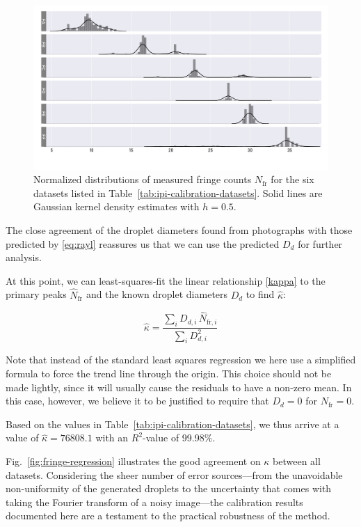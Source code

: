 \documentclass[11.5pt,oneside]{book}
\newcommand*{\figref}[1]{Fig.~\ref{#1}}
\newcommand*{\tableref}[1]{Table~\ref{#1}}
\begin{document}
\begin{figure}
    \centering
    \includegraphics[width=\textwidth]{img/fringe_histogram.pdf}
    \caption{Normalized distributions of measured fringe counts $N_\text{fr}$
        for the six datasets listed in \tableref{tab:ipi-calibration-datasets}. Solid lines are
Gaussian kernel density estimates with $h=0.5$. }
    \label{fig:fringe-histograms}
\end{figure}

The close agreement of the droplet diameters found from photographs with those
predicted by \eqref{eq:rayl} reassures us that we can use the predicted $D_d$
for further analysis.

At this point, we can least-squares-fit the linear relationship \eqref{kappa} to the primary
peaks $\hat{N}_\text{fr}$ and the known droplet diameters $D_d$ to find
$\hat{\kappa}$:

\begin{equation}
    \hat{\kappa} = \frac{\sum_i D_{d,i} \, \hat{N}_{\text{fr}, i}}{\sum_i
    D_{d,i}^2}
\end{equation}

Note that instead of the standard least squares regression we here use a
simplified formula to force the trend line through the origin. This choice
should not be made lightly, since it will usually cause the residuals to have a
non-zero mean. In this case, however, we believe it to be justified to require
that $D_d = 0$ for $N_\text{fr} = 0$.

Based on the values in \tableref{tab:ipi-calibration-datasets}, we thus arrive
at a value of $\hat{\kappa} = 76808.1$ with an $R^2$-value of 99.98\%. 

\figref{fig:fringe-regression} illustrates the good agreement on $\kappa$ between
all datasets. Considering the sheer number of error sources---from the
unavoidable non-uniformity of the generated droplets to the uncertainty that
comes with taking the Fourier transform of a noisy image---the calibration
results documented here are a testament to the practical robustness of the
method.
\end{document}
